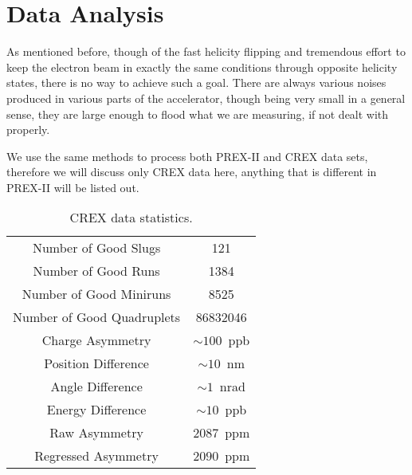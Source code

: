 \chapter{Data Analysis}
\label{cha:data_analysis}
As mentioned before, though of the fast helicity flipping and tremendous effort to keep 
the electron beam in exactly the same conditions through opposite helicity states, 
there is no way to achieve such a goal. There are always various noises produced
in various parts of the accelerator, though being very small in a general sense, 
they are large enough to flood what we are measuring, if not dealt with properly.  

We use the same methods to process both PREX-II and CREX data sets, therefore we will
discuss only CREX data here, anything that is different in PREX-II will be listed
out.

\begin{table}
    \centering
    \begin{tabular}{c | c}
	\hline
	Number of Good Slugs	    & 121   \\
	Number of Good Runs	    & 1384  \\
	Number of Good Miniruns	    & 8525  \\
	Number of Good Quadruplets  & 86832046  \\
	\hline
	Charge Asymmetry    & $\sim 100$~ppb	\\
	Position Difference & $\sim 10$~nm  \\
	Angle Difference    & $\sim 1$~nrad \\
	Energy Difference   & $\sim 10$~ppb \\
	\hline	    
	Raw Asymmetry	    & $2087$~ppm    \\
	Regressed Asymmetry & $2090$~ppm    \\
	\hline
    \end{tabular}
    \caption{CREX data statistics.}
\end{table}



